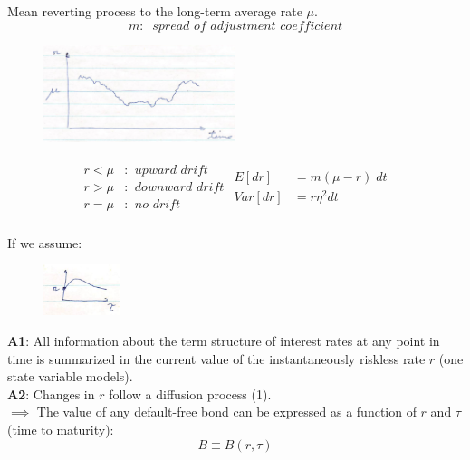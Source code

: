 \documentclass[
14pt,notheorems,hyperref={pdfauthor=whatever}
]{beamer}
\begin{document}
\begin{frame}
Mean reverting process to the long-term average rate $\mu$.
\[ m: \;\; \textit{spread of adjustment coefficient} \]
\begin{figure}[diffusion]
    \includegraphics[width=0.5\textwidth]{images/L17-diffusion.png}
    \centering
\end{figure}
\begin{align*}
\begin{split}
    r < \mu &: \;\; \textit{upward drift}\\
    r > \mu &: \;\; \textit{downward drift}\\
    r = \mu &: \;\; \textit{no drift}\\
\end{split}
\begin{split}
    E[dr] &= m(\mu-r)\;dt\\
    Var[dr] &= r \eta^2dt\\
\end{split}
\end{align*}
\end{frame}

\begin{frame}
\begin{multicols}{2}
    If we assume:
\columnbreak
\begin{figure}[r]
    \includegraphics[width=0.2\textwidth]{images/L17-r.png}
\end{figure}
\end{multicols}
\textbf{A1}: All information about the term structure of interest rates at any point in time is summarized in the current value of the instantaneously riskless rate $r$ (one state variable models).\\
\hfill\break
\textbf{A2}: Changes in $r$ follow a diffusion process (1).\\
\hfill\break
$\implies$ The value of any default-free bond can be expressed as a function of $r$ and $\tau$ (time to maturity):
\[ B \equiv B(r,\tau)\]
\end{frame}
\end{document}

